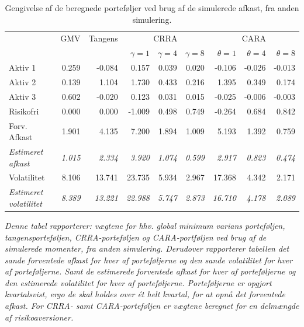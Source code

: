 \documentclass[
  a4paper,
  oneside]{memoir}
\begin{document}
\begin{table}[H]

\caption{\label{tab:sum-2}Gengivelse af de beregnede porteføljer ved brug af de simulerede afkast, fra anden simulering.}
\centering
\begin{threeparttable}
\begin{tabular}[t]{lrrrrrrrr}
\toprule
\multicolumn{1}{c}{ } & \multicolumn{1}{c}{GMV} & \multicolumn{1}{c}{Tangens} & \multicolumn{3}{c}{CRRA} & \multicolumn{3}{c}{CARA} \\
\cmidrule(l{3pt}r{3pt}){2-2} \cmidrule(l{3pt}r{3pt}){3-3} \cmidrule(l{3pt}r{3pt}){4-6} \cmidrule(l{3pt}r{3pt}){7-9}
  &   &   & $\gamma=1$ & $\gamma=4$ & $\gamma=8$ & $\theta=1$ & $\theta=4$ & $\theta=8$\\
\midrule
\rowcolor{gray!6}  Aktiv 1 & 0.259 & -0.084 & 0.157 & 0.039 & 0.020 & -0.106 & -0.026 & -0.013\\
Aktiv 2 & 0.139 & 1.104 & 1.730 & 0.433 & 0.216 & 1.395 & 0.349 & 0.174\\
\rowcolor{gray!6}  Aktiv 3 & 0.602 & -0.020 & 0.123 & 0.031 & 0.015 & -0.025 & -0.006 & -0.003\\
Risikofri & 0.000 & 0.000 & -1.009 & 0.498 & 0.749 & -0.264 & 0.684 & 0.842\\
\rowcolor{gray!6}  Forv. Afkast & 1.901 & 4.135 & 7.200 & 1.894 & 1.009 & 5.193 & 1.392 & 0.759\\
\em{Estimeret afkast} & \em{1.015} & \em{2.334} & \em{3.920} & \em{1.074} & \em{0.599} & \em{2.917} & \em{0.823} & \em{0.474}\\
\rowcolor{gray!6}  Volatilitet & 8.106 & 13.741 & 23.735 & 5.934 & 2.967 & 17.368 & 4.342 & 2.171\\
\em{Estimeret volatilitet} & \em{8.389} & \em{13.221} & \em{22.988} & \em{5.747} & \em{2.873} & \em{16.710} & \em{4.178} & \em{2.089}\\
\bottomrule
\end{tabular}
\begin{tablenotes}
\item \textit{Denne tabel rapporterer: vægtene for hhv. global minimum varians porteføljen, tangensporteføljen, CRRA-porteføljen og CARA-portføljen ved brug af de simulerede momenter, fra anden simulering. Derudover rapporterer tabellen det sande forventede afkast for hver af porteføljerne og den sande volatilitet for hver af porteføljerne.  Samt de estimerede forventede afkast for hver af porteføljerne og den estimerede volatilitet for hver af porteføljerne. Porteføljerne er opgjort kvartalsvist, ergo de skal holdes over ét helt kvartal, for at opnå det forventede afkast. For CRRA- samt CARA-porteføljen er vægtene beregnet for en delmængde af risikoaversioner.}
\end{tablenotes}
\end{threeparttable}
\end{table}
\end{document}
